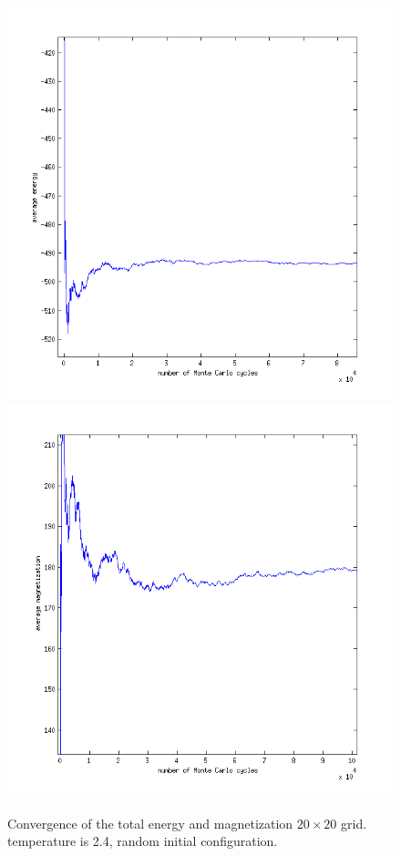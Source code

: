 \documentclass[a4paper,english, 10pt, twoside]{article}
\begin{document}
\begin{figure}[H]
 \includegraphics[scale=0.5]{energy_random_temp2dot4_zoom.png}
 \includegraphics[scale=0.5]{magnetization_random_temp2dot4_zoom}
 \caption{Convergence of the total energy and magnetization $20 \times 20$ grid. temperature is 2.4, random initial configuration.}
\label{magnet_random_temp2.4}
 \end{figure}
\end{document}

